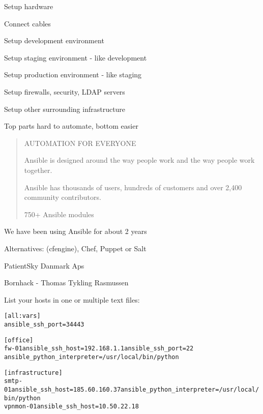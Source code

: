 \documentclass[18pt,landscape,a4paper,footrule]{foils}
\begin{document}

\begin{list2}
\item Setup hardware
\item Connect cables
\vskip 5mm
\item Setup development environment
\item Setup staging environment - like development
\item Setup production environment - like staging
\item Setup firewalls, security, LDAP servers
\item Setup other surrounding infrastructure
\end{list2}

\vskip 5mm
\centerline{Top parts hard to automate, bottom easier \smiley}




\begin{quote}\small
AUTOMATION FOR EVERYONE

Ansible is designed around the way people work and the way people work together.

Ansible has thousands of users, hundreds of customers and over 2,400 community contributors.

750+ Ansible modules
\end{quote}


\vskip 2cm
\centerline{We have been using Ansible for about 2 years}

\vskip 2cm
Alternatives: (cfengine), Chef, Puppet or Salt



\begin{list2}
\item PatientSky Danmark Aps
\item Bornhack - Thomas Tykling Rasmussen
\end{list2}


List your hosts in one or multiple text files:
\begin{alltt}\footnotesize
[all:vars]
ansible_ssh_port=34443

[office]
fw-01 ansible_ssh_host=192.168.1.1 ansible_ssh_port=22
ansible_python_interpreter=/usr/local/bin/python

[infrastructure]
smtp-01     ansible_ssh_host=185.60.160.37 ansible_python_interpreter=/usr/local/bin/python
vpnmon-01   ansible_ssh_host=10.50.22.18

\end{alltt}
\end{document}
